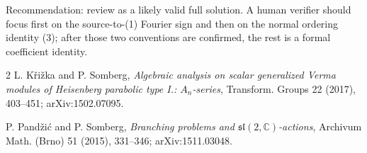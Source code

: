 \documentclass[11pt]{article}
\begin{document}
Recommendation: review as a likely valid full solution.  A human verifier
should focus first on the source-to-(1) Fourier sign and then on the normal
ordering identity (3); after those two conventions are confirmed, the rest
is a formal coefficient identity.

\begin{thebibliography}{2}
L. K\v{r}i\v{z}ka and P. Somberg,
\emph{Algebraic analysis on scalar generalized Verma modules of Heisenberg
parabolic type I.: $A_n$-series}, Transform. Groups 22 (2017), 403--451;
arXiv:1502.07095.

P. Pand\v{z}i\'c and P. Somberg,
\emph{Branching problems and $\mathfrak{sl}(2,\mathbb C)$-actions},
Archivum Math. (Brno) 51 (2015), 331--346; arXiv:1511.03048.
\end{thebibliography}
\end{document}
